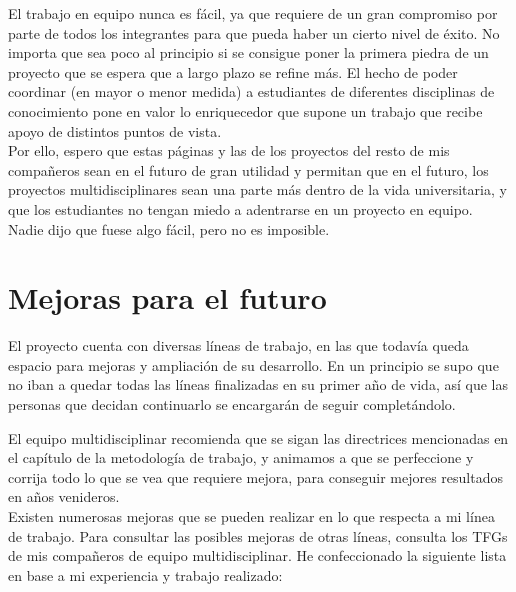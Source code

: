 El trabajo en equipo nunca es fácil, ya que requiere de un gran compromiso por parte de todos los integrantes para que pueda haber un cierto nivel de éxito. No importa que sea poco al principio si se consigue poner la primera piedra de un proyecto que se espera que a largo plazo se refine más. El hecho de poder coordinar (en mayor o menor medida) a estudiantes de diferentes disciplinas de conocimiento pone en valor lo enriquecedor que supone un trabajo que recibe apoyo de distintos puntos de vista.\\

Por ello, espero que estas páginas y las de los proyectos del resto de mis compañeros sean en el futuro de gran utilidad y permitan que en el futuro, los proyectos multidisciplinares sean una parte más dentro de la vida universitaria, y que los estudiantes no tengan miedo a adentrarse en un proyecto en equipo. Nadie dijo que fuese algo fácil, pero no es imposible.

\section{Mejoras para el futuro}
El proyecto cuenta con diversas líneas de trabajo, en las que todavía queda espacio para mejoras y ampliación de su desarrollo. En un principio se supo que no iban a quedar todas las líneas finalizadas en su primer año de vida, así que las personas que decidan continuarlo se encargarán de seguir completándolo.

El equipo multidisciplinar recomienda que se sigan las directrices mencionadas en el capítulo de la metodología de trabajo, y animamos a que se perfeccione y corrija todo lo que se vea que requiere mejora, para conseguir mejores resultados en años venideros.\\

Existen numerosas mejoras que se pueden realizar en lo que respecta a mi línea de trabajo. Para consultar las posibles mejoras de otras líneas, consulta los TFGs de mis compañeros de equipo multidisciplinar. He confeccionado la siguiente lista en base a mi experiencia y trabajo realizado:

